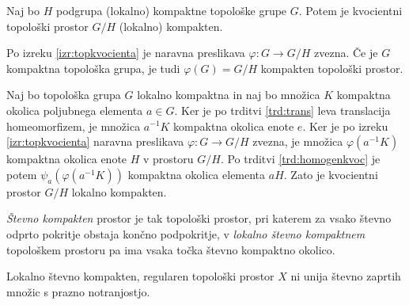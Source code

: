 \documentclass[mat1]{fmfdelo}
\begin{document}
\begin{trditev}\label{trd:kvockompakt}
	Naj bo $H$ podgrupa (lokalno) kompaktne topološke grupe $G$. Potem je kvocientni topološki prostor $G/H$ (lokalno) kompakten.
\end{trditev}

\begin{dokaz}
Po izreku \ref{izr:topkvocienta} je naravna preslikava $\varphi\colon G \to G/H$ zvezna. Če je $G$ kompaktna topološka grupa, je tudi $\varphi(G) = G/H$ kompakten topološki prostor.

Naj bo topološka grupa $G$ lokalno kompaktna in naj bo množica $K$ kompaktna okolica poljubnega elementa $a \in G$. Ker je po trditvi \ref{trd:trans} leva translacija homeomorfizem, je množica $a^{-1}K$ kompaktna okolica enote $e$. Ker je po izreku \ref{izr:topkvocienta} naravna preslikava $\varphi\colon G \to G/H$ zvezna, je množica $\varphi(a^{-1}K)$ kompaktna okolica enote $H$ v prostoru $G/H$. Po trditvi \ref{trd:homogenkvoc} je potem $\psi_a(\varphi(a^{-1}K))$ kompaktna okolica elementa $aH$. Zato je kvocientni prostor $G/H$ lokalno kompakten.
\end{dokaz}

\begin{definicija}
\emph{Števno kompakten} prostor je tak topološki prostor, pri katerem za vsako števno odprto pokritje obstaja končno podpokritje, v \emph{lokalno števno kompaktnem} topološkem prostoru pa ima vsaka točka števno kompaktno okolico. 
\end{definicija}

\begin{trditev}\label{trd:kompni}
Lokalno števno kompakten, regularen topološki prostor $X$ ni unija števno zaprtih množic s prazno notranjostjo.
\end{trditev}
\end{document}
